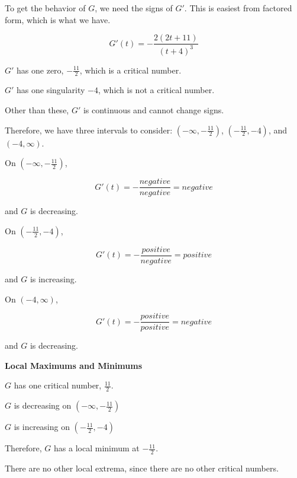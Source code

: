 \documentclass{ximera}
\begin{document}
\begin{explanation}

To get the behavior of $G$, we need the signs of $G'$.  This is easiest from factored form, which is what we have.


\[
G'(t) = -\frac{2(2t+11)}{(t+4)^3}
\]


$G'$ has one zero, $-\frac{11}{2}$, which is a critical number. 


$G'$ has one singularity $-4$, which is not a critical number. 



Other than these, $G'$ is continuous and cannot change signs.


Therefore, we have three intervals to consider:  $\left( -\infty, -\frac{11}{2} \right)$, $\left( -\frac{11}{2}, -4 \right)$, and $(-4, \infty)$.



On $\left( -\infty, -\frac{11}{2} \right)$, 

\[
G'(t) = -\frac{negative}{negative} = negative
\]


and $G$ is decreasing.






On $\left( -\frac{11}{2}, -4 \right)$, 

\[
G'(t) = -\frac{positive}{negative} = positive
\]


and $G$ is increasing.







On $(-4, \infty)$, 

\[
G'(t) = -\frac{positive}{positive} = negative
\]


and $G$ is decreasing.





\end{explanation}
















\textbf{\textcolor{purple!85!blue}{Local Maximums and Minimums}} 

\begin{explanation}


$G$ has one critical number, $\frac{11}{2}$.


$G$ is decreasing on $\left( -\infty, -\frac{11}{2} \right)$

$G$ is increasing on $\left( -\frac{11}{2}, -4 \right)$

Therefore, $G$ has a local minimum at $-\frac{11}{2}$.


There are no other local extrema, since there are no other critical numbers.


\end{explanation}
\end{document}
